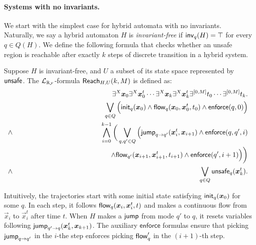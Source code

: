 \documentclass[10pt,envcountsect]{llncs}
\newcommand{\enforce}{\mathsf{enforce}}
\begin{document}
\paragraph{Systems with no invariants.} We start with the simplest case for hybrid automata with no invariants. Naturally, we say a hybrid automaton $H$ is {\em invariant-free} if $\mathsf{inv}_q(H) = \top$ for every $q\in Q(H)$. We define the following formula that checks whether an unsafe region is reachable after exactly $k$ steps of discrete transition in a hybrid system.
\begin{definition}
Suppose $H$ is invariant-free, and $U$ a subset of its state space represented by $\mathsf{unsafe}$. The $\mathcal{L}_{\mathbb{R}_{\mathcal{F}}}$-formula $\mathsf{Reach}_{H,U}(k,M)$ is defined as:
\begin{eqnarray*}
& &\exists^X \vec x_{0} \exists^X\vec x_{0}^t\cdots \exists^X \vec x_{k}\exists^X\vec x_{k}^t\exists^{[0,M]}t_0\cdots \exists^{[0,M]}t_k.\\
& &\bigvee_{q\in Q} \Big(\init_{q}(\vec x_{0})\wedge \flow_{q}(\vec x_{0}, \vec x_{0}^t, t_0)\wedge \enforce(q,0)\Big)\\%
\wedge & & \bigwedge_{i=0}^{k-1}\bigg( \bigvee_{q, q'\in Q} \Big(\jump_{q\rightarrow q'}(\vec x_{i}^t, \vec x_{i+1})\wedge \enforce(q,q',i)\\
& & \hspace{4.7cm}\wedge\flow_{q'}(\vec x_{i+1}, \vec x_{i+1}^t, t_{i+1})\wedge \enforce(q',i+1)\Big)\bigg)\\
\wedge & & \bigvee_{q\in Q} \unsafe_q(\vec x_{k}^t).
\end{eqnarray*}
\end{definition}
Intuitively, the trajectories start with some initial state satisfying $\init_q(\vec x_{0})$ for some $q$. In each step, it follows $\flow_q(\vec x_{i}, \vec x_{i}^t, t)$ and makes a continuous flow from $\vec x_i$ to $\vec x_i^t$ after time $t$. When $H$ makes a $\mathsf{jump}$ from mode $q'$ to $q$, it resets variables following $\jump_{q'\rightarrow q}(\vec x_{k}^t, \vec x_{k+1})$. The auxiliary $\enforce$ formulas ensure that picking $\mathsf{jump}_{q\rightarrow q'}$ in the $i$-the step enforces picking $\mathsf{flow}_q'$ in the $(i+1)$-th step.
\end{document}

